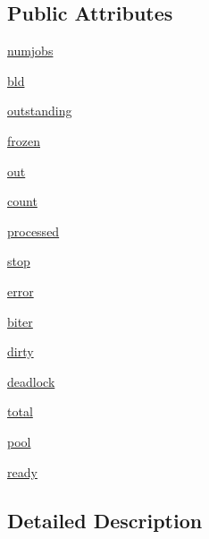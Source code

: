 \subsection*{Public Attributes}
\begin{DoxyCompactItemize}
\item 
\hyperlink{classwaflib_1_1_runner_1_1_parallel_a973dd9bdc97ad5a966bf4ed6ea3eb71f}{numjobs}
\item 
\hyperlink{classwaflib_1_1_runner_1_1_parallel_a710f2069db915f1b04538ed7989511ff}{bld}
\item 
\hyperlink{classwaflib_1_1_runner_1_1_parallel_aab692007197e0318e7e77634e26e5726}{outstanding}
\item 
\hyperlink{classwaflib_1_1_runner_1_1_parallel_a2893dc39d61509971ea5a54967ba7fd2}{frozen}
\item 
\hyperlink{classwaflib_1_1_runner_1_1_parallel_a085561b8b71c470a0c67325d2ea9488f}{out}
\item 
\hyperlink{classwaflib_1_1_runner_1_1_parallel_a9c87e16b0bebafe91d332b5a66ea1246}{count}
\item 
\hyperlink{classwaflib_1_1_runner_1_1_parallel_a3939601509be380ad8d3dd54135696f5}{processed}
\item 
\hyperlink{classwaflib_1_1_runner_1_1_parallel_a3bc5eef33e47661f15616e999fa97667}{stop}
\item 
\hyperlink{classwaflib_1_1_runner_1_1_parallel_a92bf9f568b7966612f16ea334c5c1587}{error}
\item 
\hyperlink{classwaflib_1_1_runner_1_1_parallel_a2281e228820fdd461d24b93444273017}{biter}
\item 
\hyperlink{classwaflib_1_1_runner_1_1_parallel_a353e81a6612036fa5682ab9ab2bbd864}{dirty}
\item 
\hyperlink{classwaflib_1_1_runner_1_1_parallel_a5997fd7cef5fcb940b5f064cbd7b5107}{deadlock}
\item 
\hyperlink{classwaflib_1_1_runner_1_1_parallel_ac3be316b11ba963fdd757cb7c1540750}{total}
\item 
\hyperlink{classwaflib_1_1_runner_1_1_parallel_a5e8658e1f594622045608a6a822a5326}{pool}
\item 
\hyperlink{classwaflib_1_1_runner_1_1_parallel_a3c539bd8d2fa0fe19597c13cf801afad}{ready}
\end{DoxyCompactItemize}


\subsection{Detailed Description}


